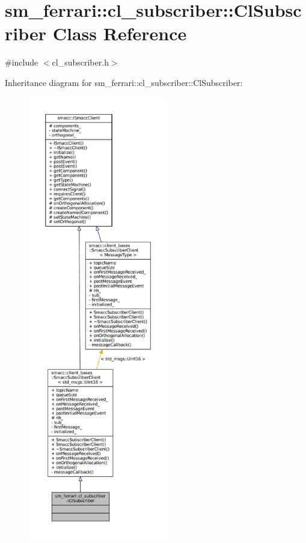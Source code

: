 \hypertarget{classsm__ferrari_1_1cl__subscriber_1_1ClSubscriber}{}\section{sm\+\_\+ferrari\+:\+:cl\+\_\+subscriber\+:\+:Cl\+Subscriber Class Reference}
\label{classsm__ferrari_1_1cl__subscriber_1_1ClSubscriber}


{\ttfamily \#include $<$cl\+\_\+subscriber.\+h$>$}



Inheritance diagram for sm\+\_\+ferrari\+:\+:cl\+\_\+subscriber\+:\+:Cl\+Subscriber\+:
\nopagebreak
\begin{figure}[H]
\begin{center}
\leavevmode
\includegraphics[height=550pt]{classsm__ferrari_1_1cl__subscriber_1_1ClSubscriber__inherit__graph}
\end{center}
\end{figure}


